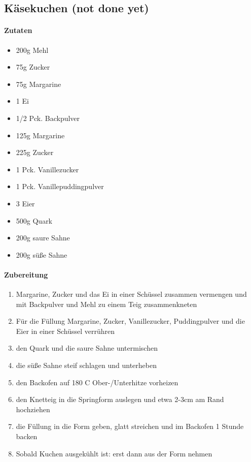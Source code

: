 \newpage
\subsection{Käsekuchen (not done yet)}
\paragraph{Zutaten}
\begin{itemize}[noitemsep]
	\item 200g Mehl
	\item 75g Zucker
	\item 75g Margarine
	\item 1 Ei
	\item 1/2 Pck. Backpulver
	\vspace{0.5cm}
	\item 125g Margarine
	\item 225g Zucker
	\item 1 Pck. Vanillezucker
	\item 1 Pck. Vanillepuddingpulver
	\item 3 Eier
	\item 500g Quark
	\item 200g saure Sahne
	\item 200g süße Sahne
\end{itemize}
\paragraph{Zubereitung}
\begin{enumerate}[noitemsep]
	\item Margarine, Zucker und das Ei in einer Schüssel zusammen vermengen und mit Backpulver und Mehl zu einem Teig zusammenkneten 
	\item Für die Füllung Margarine, Zucker, Vanillezucker, Puddingpulver und die Eier in einer Schüssel verrühren
	\item den Quark und die saure Sahne untermischen
	\item die süße Sahne steif schlagen und unterheben
	\item den Backofen auf 180 \textdegree C Ober-/Unterhitze vorheizen
	\item den Knetteig in die Springform auslegen und etwa 2-3cm am Rand hochziehen
	\item die Füllung in die Form geben, glatt streichen und im Backofen 1 Stunde backen
	\item Sobald Kuchen ausgekühlt ist: erst dann aus der Form nehmen
\end{enumerate}